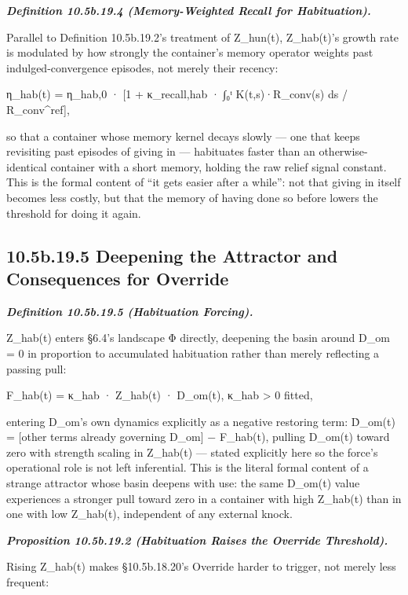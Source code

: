 \documentclass[
]{article}
\begin{document}
\emph{\textbf{Definition 10.5b.19.4 (Memory-Weighted Recall for
Habituation).}}

Parallel to Definition 10.5b.19.2's treatment of Z\_hun(t), Z\_hab(t)'s
growth rate is modulated by how strongly the container's memory operator
weights past indulged-convergence episodes, not merely their recency:

η\_hab(t) = η\_hab,0 · {[}1 + κ\_recall,hab · ∫₀ᵗ K(t,s)·R\_conv(s) ds /
R\_conv\^{}ref{]},

so that a container whose memory kernel decays slowly --- one that keeps
revisiting past episodes of giving in --- habituates faster than an
otherwise-identical container with a short memory, holding the raw
relief signal constant. This is the formal content of ``it gets easier
after a while'': not that giving in itself becomes less costly, but that
the memory of having done so before lowers the threshold for doing it
again.

\hypertarget{b.19.5-deepening-the-attractor-and-consequences-for-override}{%
\subsection{10.5b.19.5 Deepening the Attractor and Consequences for
Override}\label{b.19.5-deepening-the-attractor-and-consequences-for-override}}

\emph{\textbf{Definition 10.5b.19.5 (Habituation Forcing).}}

Z\_hab(t) enters §6.4's landscape Φ directly, deepening the basin around
D\_om = 0 in proportion to accumulated habituation rather than merely
reflecting a passing pull:

F\_hab(t) = κ\_hab · Z\_hab(t) · D\_om(t), κ\_hab \textgreater{} 0
fitted,

entering D\_om's own dynamics explicitly as a negative restoring term:
Ḋ\_om(t) = {[}other terms already governing D\_om{]} − F\_hab(t),
pulling D\_om(t) toward zero with strength scaling in Z\_hab(t) ---
stated explicitly here so the force's operational role is not left
inferential. This is the literal formal content of a strange attractor
whose basin deepens with use: the same D\_om(t) value experiences a
stronger pull toward zero in a container with high Z\_hab(t) than in one
with low Z\_hab(t), independent of any external knock.

\emph{\textbf{Proposition 10.5b.19.2 (Habituation Raises the Override
Threshold).}}

Rising Z\_hab(t) makes §10.5b.18.20's Override harder to trigger, not
merely less frequent:
\end{document}
